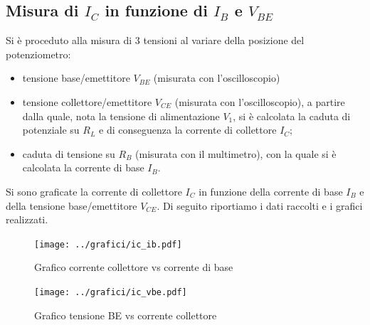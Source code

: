 \documentclass[10pt,a4paper]{article}
\begin{document}
\subsection{Misura di $I_C$ in funzione di $I_B$ e $V_{BE}$}
Si è proceduto alla misura di 3 tensioni al variare della posizione del potenziometro:
\begin{itemize}
	\item tensione base/emettitore $V_{BE}$ (misurata con l'oscilloscopio)
	\item tensione collettore/emettitore $V_{CE}$ (misurata con l'oscilloscopio), a partire dalla quale, nota la tensione di alimentazione $V_1$, si è calcolata la caduta di potenziale su $R_L$ e di conseguenza la corrente di collettore $I_C$;
	\item caduta di tensione su $R_B$ (misurata con il multimetro), con la quale si è calcolata la corrente di base $I_B$.
\end{itemize}
Si sono graficate la corrente di collettore $I_C$ in funzione della corrente di base $I_B$ e della tensione base/emettitore $V_{CE}$.
Di seguito riportiamo i dati raccolti e i grafici realizzati.

\begin{figure}[h!]
	\centering
	\begin{minipage}[h!]{0.4\textwidth}
		\centering
		\resizebox{1\textwidth}{!}{
			}
	\end{minipage}
	\begin{minipage}[d]{0.59\textwidth}
		\centering
		\texttt{[image: ../grafici/ic\_ib.pdf]}
		\caption{Grafico corrente collettore vs corrente di base}
		\label{ibic}
		\centering
		\texttt{[image: ../grafici/ic\_vbe.pdf]}
		\caption{Grafico tensione BE vs corrente collettore}
		\label{vbeic}
		\end{minipage}
\end{figure}
\end{document}
